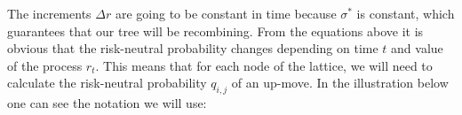 \documentclass[titlepage, 12pt]{article}
\begin{document}
	The increments $\Delta r$ are going to be constant in time because $\sigma^*$ is constant, which guarantees that our tree will be recombining. From the equations above it is obvious that the risk-neutral probability changes depending on time $t$ and value of the process $r_t$. This means that for each node of the lattice, we will need to calculate the risk-neutral probability $q_{i,j}$ of an up-move. In the illustration below one can see the notation we will use:
	
	
\end{document}

